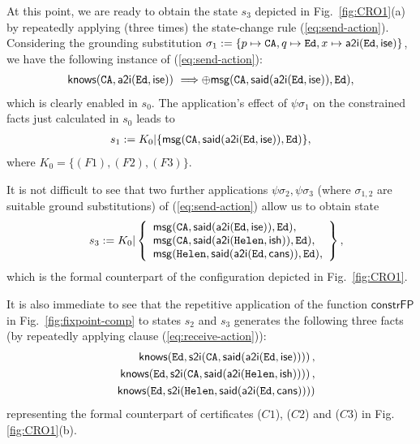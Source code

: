 \documentclass[conference]{llncs}
\newcommand{\theCA}{\ensuremath \mathtt{CA}}
\newcommand{\Ed}{\ensuremath \mathtt{Ed}}
\newcommand{\Helen}{\ensuremath \mathtt{Helen}}
\newcommand{\canstoredoc}{\ensuremath \mathsf{cans}}
\newcommand{\ishead}{\ensuremath \mathsf{ish}}
\newcommand{\isemployee}{\ensuremath \mathsf{ise}}
\newcommand{\know}{\ensuremath \mathsf{knows}}
\newcommand{\msg}{\ensuremath \mathsf{msg}}
\newcommand{\atoi}{\ensuremath \mathsf{a2i}}
\newcommand{\stoi}{\ensuremath \mathsf{s2i}}
\newcommand{\said}{\ensuremath \mathsf{said}}
\begin{document}
{ At this point, we are ready to obtain the state $s_3$ depicted in Fig.~\ref{fig:CRO1}(a) by
repeatedly applying (three times) the state-change rule (\ref{eq:send-action}).
Considering the grounding substitution $\sigma_1:=\{ p\mapsto \theCA, q\mapsto \Ed,
  x\mapsto \atoi(\Ed,\isemployee) \}$, we have the
  following instance of (\ref{eq:send-action}):
  \begin{align*}
   \know(\theCA,\atoi(\Ed,\isemployee))~
     \Longrightarrow   \oplus \msg(\theCA, 
                        \said(\atoi(\Ed,\isemployee)),
                        \Ed) , 
  \end{align*}
  which is clearly enabled in $s_0$. The application's effect of $\psi\sigma_1$ on the constrained facts 
  just calculated in $s_0$ leads to
  \begin{eqnarray*}
    s_1:= K_0 | 
    \{ \msg(\theCA, \said(\atoi(\Ed,\isemployee)),
                        \Ed)  \},
  \end{eqnarray*}
  where $K_0=\{(F1), (F2), (F3)\}$.
  
It is not difficult to see
  that two further applications $\psi\sigma_2, \psi\sigma_3$ (where $\sigma_{1,2}$ are suitable ground substitutions) of
  (\ref{eq:send-action}) allow us to obtain state
  \begin{eqnarray*}
  &&  s_3:= K_0 | \left\{ 
    \begin{array}{l}
      \msg(\theCA, \said(\atoi(\Ed,\isemployee)), 
                        \Ed), \\
      \msg(\theCA, \said(\atoi(\Helen,\ishead)), 
                        \Ed), \\
      \msg(\Helen, \said(\atoi(\Ed,\canstoredoc)), 
                        \Ed), 
    \end{array}
    \right\},
  \end{eqnarray*}
  which is the formal counterpart of the configuration depicted in Fig.~\ref{fig:CRO1}.  
  
  It is also immediate to see that the repetitive application of the function $\mathsf{constrFP}$ in Fig.~\ref{fig:fixpoint-comp} to states $s_2$ and $s_3$ generates the following three
  facts (by repeatedly applying clause (\ref{eq:receive-action})):
 \begin{eqnarray*}
   && \know(\Ed, \stoi(\theCA, \said(\atoi(\Ed,\isemployee))))\,, \\ 
    &&\know(\Ed, \stoi(\theCA, \said(\atoi(\Helen,\ishead))))\,, \\ 
    && \know(\Ed, \stoi(\Helen, \said(\atoi(\Ed,\canstoredoc)))) 
  \end{eqnarray*}
 representing the formal counterpart of certificates ($C1$), ($C2$) and ($C3$) in Fig. \ref{fig:CRO1}(b).

}
\end{document}
